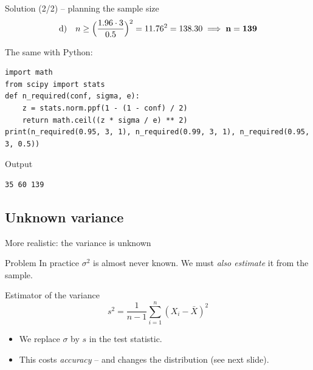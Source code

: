 \documentclass[aspectratio=169,11pt]{beamer}
\begin{document}
\begin{frame}[fragile]{Solution (2/2) -- planning the sample size}
  \lstset{aboveskip=2pt,belowskip=2pt}
  \[
    \text{d)}\quad n \ge \Bigl(\frac{1.96\cdot3}{0.5}\Bigr)^{2}=11.76^{2}=138.30
       \;\Longrightarrow\;\mathbf{n=139}
  \]
  \par\smallskip
  {\small The same with Python:\par}
\begin{lstlisting}
import math
from scipy import stats
def n_required(conf, sigma, e):
    z = stats.norm.ppf(1 - (1 - conf) / 2)
    return math.ceil((z * sigma / e) ** 2)
print(n_required(0.95, 3, 1), n_required(0.99, 3, 1), n_required(0.95, 3, 0.5))
\end{lstlisting}
  \begin{block}{Output}
\begin{lstlisting}[style=Pyout]
35 60 139
\end{lstlisting}
  \end{block}
\end{frame}

\subsection{Unknown variance}

\begin{frame}{More realistic: the variance is unknown}
  \begin{block}{Problem}
    In practice $\sigma^{2}$ is almost never known. We must \emph{also
    estimate} it from the sample.
  \end{block}
  \begin{block}{Estimator of the variance}
    \[
      s^{2} = \frac{1}{n-1}\sum_{i=1}^{n}(X_i - \bar{X})^{2}
    \]
  \end{block}
  \begin{itemize}
    \item We replace $\sigma$ by $s$ in the test statistic.
    \item This costs \emph{accuracy} -- and changes the distribution
          (see next slide).
  \end{itemize}
\end{frame}
\end{document}
